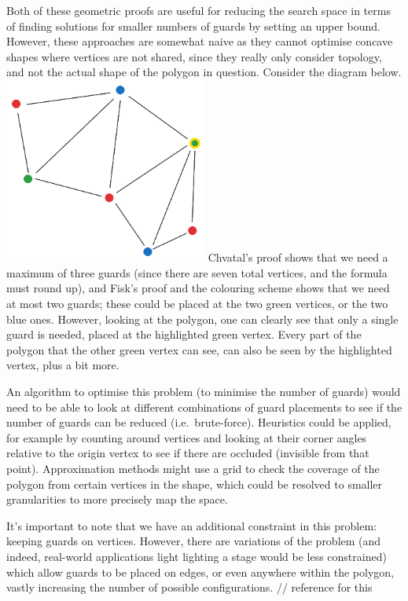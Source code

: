 \documentclass[
]{article}
\begin{document}
Both of these geometric proofs are useful for reducing the search space
in terms of finding solutions for smaller numbers of guards by setting
an upper bound. However, these approaches are somewhat naive as they
cannot optimise concave shapes where vertices are not shared, since they
really only consider topology, and not the actual shape of the polygon
in question. Consider the diagram below.
\includegraphics[width=0.5\textwidth,height=\textheight]{diagrams/Complicated Gallery.png}
Chvatal's proof shows that we need a maximum of three guards (since
there are seven total vertices, and the formula must round up), and
Fisk's proof and the colouring scheme shows that we need at most two
guards; these could be placed at the two green vertices, or the two blue
ones. However, looking at the polygon, one can clearly see that only a
single guard is needed, placed at the highlighted green vertex. Every
part of the polygon that the other green vertex can see, can also be
seen by the highlighted vertex, plus a bit more.

An algorithm to optimise this problem (to minimise the number of guards)
would need to be able to look at different combinations of guard
placements to see if the number of guards can be reduced
(i.e.~brute-force). Heuristics could be applied, for example by counting
around vertices and looking at their corner angles relative to the
origin vertex to see if there are occluded (invisible from that point).
Approximation methods might use a grid to check the coverage of the
polygon from certain vertices in the shape, which could be resolved to
smaller granularities to more precisely map the space.

It's important to note that we have an additional constraint in this
problem: keeping guards on vertices. However, there are variations of
the problem (and indeed, real-world applications light lighting a stage
would be less constrained) which allow guards to be placed on edges, or
even anywhere within the polygon, vastly increasing the number of
possible configurations. // reference for this
\end{document}

